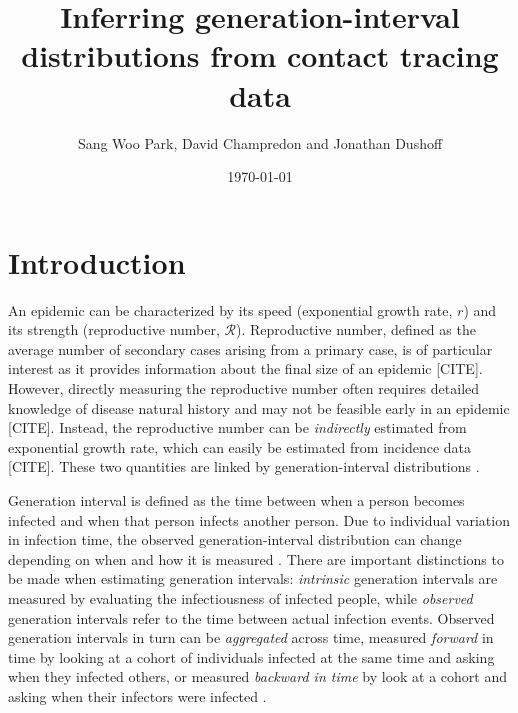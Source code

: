 \documentclass[12pt]{article}
\title{Inferring generation-interval distributions from contact tracing data}
\author{Sang Woo Park, David Champredon and Jonathan Dushoff}
\date{\today}
\newcommand{\RR}{\ensuremath{{\mathcal R}}}
\begin{document}
\maketitle

\section{Introduction}

An epidemic can be characterized by its speed (exponential growth rate, $r$) and its strength (reproductive number, \RR).
Reproductive number, defined as the average number of secondary cases arising from a primary case, is of particular interest as it provides information about the final size of an epidemic [CITE].
However, directly measuring the reproductive number often requires detailed knowledge of disease natural history and may not be feasible early in an epidemic [CITE].
Instead, the reproductive number can be \emph{indirectly} estimated from exponential growth rate, which can easily be estimated from incidence data [CITE].
These two quantities are linked by generation-interval distributions \citep{wallinga2007generation}.

Generation interval is defined as the time between when a person becomes infected and when that person infects another person.
Due to individual variation in infection time, the observed generation-interval distribution can change depending on when and how it is measured \citep{svensson2007note, kenah2008generation, nishiura2010time}.
There are important distinctions to be made when estimating generation intervals: \emph{intrinsic} generation intervals are measured by evaluating the infectiousness of infected people,
while \emph{observed} generation intervals refer to the time between actual infection events.
Observed generation intervals in turn can be \emph{aggregated} across time, measured \emph{forward} in time by looking at a cohort of individuals infected at the same time and asking when they infected others, or measured \emph{backward in time} by look at a cohort and asking when their infectors were infected \citep{champredon2015intrinsic}.
\end{document}
